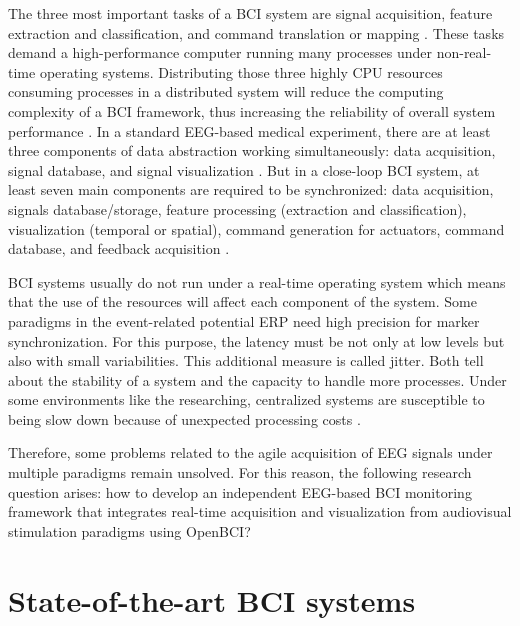 The three most important tasks of a \gls*{BCI} system are signal acquisition, feature extraction and classification, and command translation or mapping \cite{sugiarto2009application}. These tasks demand a high-performance computer running many processes under non-real-time operating systems. Distributing those three highly CPU resources consuming processes in a distributed system will reduce the computing complexity of a \gls*{BCI} framework, thus increasing the reliability of overall system performance \cite{sugiarto2009application}. In a standard \gls*{EEG}-based medical experiment, there are at least three components of data abstraction working simultaneously: data acquisition, signal database, and signal visualization \cite{alvarez2015clinical, beniczky2017standardized}. But in a close-loop \gls*{BCI} system, at least seven main components are required to be synchronized: data acquisition, signals database/storage, feature processing (extraction and classification), visualization (temporal or spatial), command generation for actuators, command database, and feedback acquisition \cite{sugiarto2009application}.

\gls*{BCI} systems usually do not run under a real-time operating system which means that the use of the resources will affect each component of the system. Some paradigms in the event-related potential \gls*{ERP} need high precision for marker synchronization. For this purpose, the latency must be not only at low levels but also with small variabilities. This additional measure is called jitter. Both tell about the stability of a system and the capacity to handle more processes. Under some environments like the researching, centralized systems are susceptible to being slow down because of unexpected processing costs \cite{assran2020advances, deshmukh2021collaborative}. 

Therefore, some problems related to the agile acquisition of \gls*{EEG} signals under multiple paradigms remain unsolved. For this reason, the following research question arises: how to develop an independent \gls*{EEG}-based \gls*{BCI} monitoring framework that integrates real-time acquisition and visualization from audiovisual stimulation paradigms using OpenBCI?

\section{State-of-the-art \gls*{BCI} systems}\label{sec:state_of_art}

